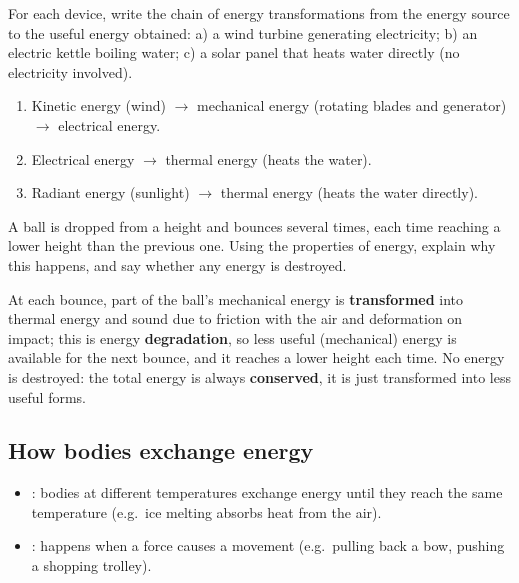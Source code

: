 \begin{exercise}
    For each device, write the chain of energy transformations from the energy source to the useful energy obtained: a) a wind turbine generating electricity; b) an electric kettle boiling water; c) a solar panel that heats water directly (no electricity involved).
    \begin{solu}
        \begin{enumerate}[label=\alph*)]
            \item Kinetic energy (wind) \(\to\) mechanical energy (rotating blades and generator) \(\to\) electrical energy.
            \item Electrical energy \(\to\) thermal energy (heats the water).
            \item Radiant energy (sunlight) \(\to\) thermal energy (heats the water directly).
        \end{enumerate}
    \end{solu}
\end{exercise}

\begin{exercise}
    A ball is dropped from a height and bounces several times, each time reaching a lower height than the previous one. Using the properties of energy, explain why this happens, and say whether any energy is destroyed.
    \begin{solu}
        At each bounce, part of the ball's mechanical energy is \textbf{transformed} into thermal energy and sound due to friction with the air and deformation on impact; this is energy \textbf{degradation}, so less useful (mechanical) energy is available for the next bounce, and it reaches a lower height each time. No energy is destroyed: the total energy is always \textbf{conserved}, it is just transformed into less useful forms.
    \end{solu}
\end{exercise}

\subsection{How bodies exchange energy}

\begin{itemize}
    \item {}: bodies at different temperatures exchange energy until they reach the same temperature (e.g.\ ice melting absorbs heat from the air).
    \item {}: happens when a force causes a movement (e.g.\ pulling back a bow, pushing a shopping trolley).
\end{itemize}

